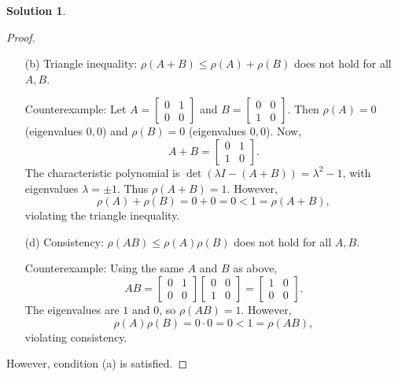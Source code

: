 \documentclass[12pt]{article}
\theoremstyle{definition}
\newtheorem*{solution}{\normalfont\textbf{Solution}}
\begin{document}
\begin{enumerate}[leftmargin=*]
\begin{solution}
\begin{proof}
\begin{enumerate}
                    \item[(b)] Triangle inequality: \(\rho(A + B) \leq \rho(A) + \rho(B)\) does not hold for all \(A, B\).
                    
                    Counterexample: Let \(A = \begin{bmatrix} 0 & 1 \\ 0 & 0 \end{bmatrix}\) and \(B = \begin{bmatrix} 0 & 0 \\ 1 & 0 \end{bmatrix}\). Then \(\rho(A) = 0\) (eigenvalues \(0, 0\)) and \(\rho(B) = 0\) (eigenvalues \(0, 0\)). Now,
                    \[
                    A + B = \begin{bmatrix} 0 & 1 \\ 1 & 0 \end{bmatrix}.
                    \]
                    The characteristic polynomial is \(\det(\lambda I - (A+B)) = \lambda^2 - 1\), with eigenvalues \(\lambda = \pm 1\). Thus \(\rho(A + B) = 1\). However,
                    \[
                    \rho(A) + \rho(B) = 0 + 0 = 0 < 1 = \rho(A + B),
                    \]
                    violating the triangle inequality.

                    \item[(d)] Consistency: \(\rho(AB) \leq \rho(A)\rho(B)\) does not hold for all \(A, B\).
                    
                    Counterexample: Using the same \(A\) and \(B\) as above,
                    \[
                    AB = \begin{bmatrix} 0 & 1 \\ 0 & 0 \end{bmatrix} \begin{bmatrix} 0 & 0 \\ 1 & 0 \end{bmatrix} = \begin{bmatrix} 1 & 0 \\ 0 & 0 \end{bmatrix}.
                    \]
                    The eigenvalues are \(1\) and \(0\), so \(\rho(AB) = 1\). However,
                    \[
                    \rho(A)\rho(B) = 0 \cdot 0 = 0 < 1 = \rho(AB),
                    \]
                    violating consistency.
                \end{enumerate}

            However, condition (a) is satisfied.


\end{proof}
\end{solution}
\end{enumerate}
\end{document}
